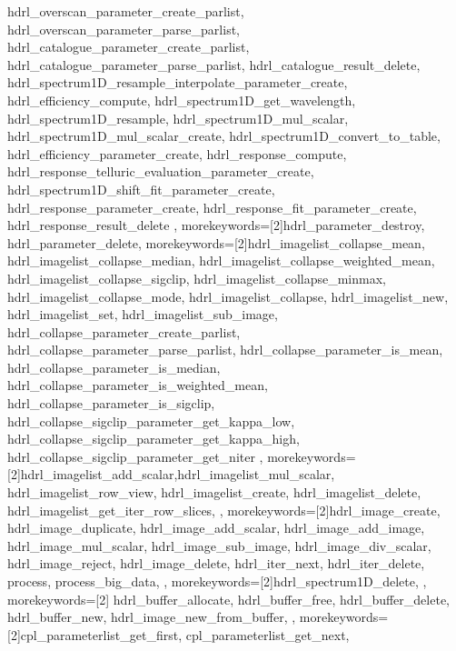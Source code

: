 \documentclass[pdftex,a4paper,twoside,11pt]{article}
\begin{document}
{{        hdrl_overscan_parameter_create_parlist,
        hdrl_overscan_parameter_parse_parlist,
        hdrl_catalogue_parameter_create_parlist,
        hdrl_catalogue_parameter_parse_parlist,
        hdrl_catalogue_result_delete,
        hdrl_spectrum1D_resample_interpolate_parameter_create,
        hdrl_efficiency_compute,
        hdrl_spectrum1D_get_wavelength,
        hdrl_spectrum1D_resample,
        hdrl_spectrum1D_mul_scalar,
        hdrl_spectrum1D_mul_scalar_create,
        hdrl_spectrum1D_convert_to_table,
        hdrl_efficiency_parameter_create,
        hdrl_response_compute,
        hdrl_response_telluric_evaluation_parameter_create, 
        hdrl_spectrum1D_shift_fit_parameter_create,
        hdrl_response_parameter_create,
        hdrl_response_fit_parameter_create,
        hdrl_response_result_delete
    },
    morekeywords=[2]{hdrl_parameter_destroy, hdrl_parameter_delete},
    morekeywords=[2]{hdrl_imagelist_collapse_mean,
        hdrl_imagelist_collapse_median,
        hdrl_imagelist_collapse_weighted_mean,
        hdrl_imagelist_collapse_sigclip,
        hdrl_imagelist_collapse_minmax,
        hdrl_imagelist_collapse_mode,
        hdrl_imagelist_collapse,
        hdrl_imagelist_new,
        hdrl_imagelist_set,
        hdrl_imagelist_sub_image,
        hdrl_collapse_parameter_create_parlist,
        hdrl_collapse_parameter_parse_parlist,
        hdrl_collapse_parameter_is_mean,
        hdrl_collapse_parameter_is_median,
        hdrl_collapse_parameter_is_weighted_mean,
        hdrl_collapse_parameter_is_sigclip,
        hdrl_collapse_sigclip_parameter_get_kappa_low,
        hdrl_collapse_sigclip_parameter_get_kappa_high,
        hdrl_collapse_sigclip_parameter_get_niter
    },
    morekeywords=[2]{hdrl_imagelist_add_scalar,hdrl_imagelist_mul_scalar,
        hdrl_imagelist_row_view,
        hdrl_imagelist_create,
        hdrl_imagelist_delete,
        hdrl_imagelist_get_iter_row_slices,
    },
    morekeywords=[2]{hdrl_image_create, hdrl_image_duplicate,
        hdrl_image_add_scalar,
        hdrl_image_add_image,
        hdrl_image_mul_scalar,
        hdrl_image_sub_image,
        hdrl_image_div_scalar,
        hdrl_image_reject,
        hdrl_image_delete,
        hdrl_iter_next,
        hdrl_iter_delete,
        process,
        process_big_data,
    },
    morekeywords=[2]{hdrl_spectrum1D_delete,
    },
    morekeywords=[2]{
        hdrl_buffer_allocate,
        hdrl_buffer_free,
        hdrl_buffer_delete,
        hdrl_buffer_new,
        hdrl_image_new_from_buffer,
    },
    morekeywords=[2]{cpl_parameterlist_get_first, cpl_parameterlist_get_next,
}}
\end{document}
